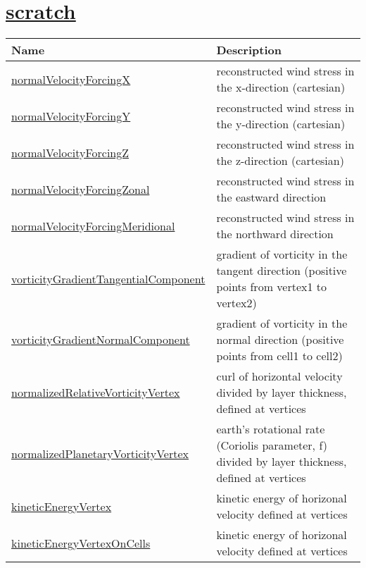 \section[scratch]{\hyperref[sec:var_sec_scratch]{scratch}}
\label{sec:var_tab_scratch}
{\small
\begin{center}
\begin{longtable}{| p{2.0in} | p{4.0in} |}
	\hline
	{\bf Name} & {\bf Description} \\
	\hline
	\hyperref[subsec:var_sec_scratch_normalVelocityForcingX]{normalVelocityForcingX} & reconstructed wind stress in the x-direction (cartesian) \\
	\hline
	\hyperref[subsec:var_sec_scratch_normalVelocityForcingY]{normalVelocityForcingY} & reconstructed wind stress in the y-direction (cartesian) \\
	\hline
	\hyperref[subsec:var_sec_scratch_normalVelocityForcingZ]{normalVelocityForcingZ} & reconstructed wind stress in the z-direction (cartesian) \\
	\hline
	\hyperref[subsec:var_sec_scratch_normalVelocityForcingZonal]{normalVelocityForcingZonal} & reconstructed wind stress in the eastward direction \\
	\hline
	\hyperref[subsec:var_sec_scratch_normalVelocityForcingMeridional]{normalVelocityForcingMeridional} & reconstructed wind stress in the northward direction \\
	\hline
	\hyperref[subsec:var_sec_scratch_vorticityGradientTangentialComponent]{vorticityGradientTangentialComponent} & gradient of vorticity in the tangent direction (positive points from vertex1 to vertex2) \\
	\hline
	\hyperref[subsec:var_sec_scratch_vorticityGradientNormalComponent]{vorticityGradientNormalComponent} & gradient of vorticity in the normal direction (positive points from cell1 to cell2) \\
	\hline
	\hyperref[subsec:var_sec_scratch_normalizedRelativeVorticityVertex]{normalizedRelativeVorticityVertex} & curl of horizontal velocity divided by layer thickness, defined at vertices \\
	\hline
	\hyperref[subsec:var_sec_scratch_normalizedPlanetaryVorticityVertex]{normalizedPlanetaryVorticityVertex} & earth's rotational rate (Coriolis parameter, f) divided by layer thickness, defined at vertices \\
	\hline
	\hyperref[subsec:var_sec_scratch_kineticEnergyVertex]{kineticEnergyVertex} & kinetic energy of horizonal velocity defined at vertices \\
	\hline
	\hyperref[subsec:var_sec_scratch_kineticEnergyVertexOnCells]{kineticEnergyVertexOnCells} & kinetic energy of horizonal velocity defined at vertices \\
	\hline
\end{longtable}
\end{center}
}
